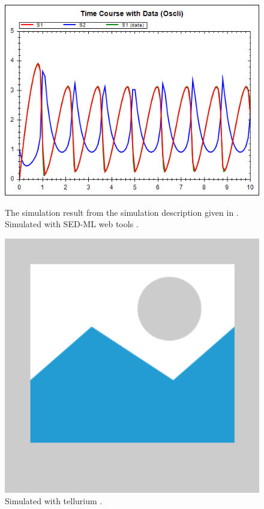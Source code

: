 \begin{figure}[ht]
    \centering
    \begin{minipage}{0.47\textwidth}
        \centering
        \includegraphics[width=1.0\textwidth]{examples/plotting-data/results/sedml_webtools/timecourse_with_data}
        \caption{The simulation result from the simulation description given in . Simulated with SED-ML web tools \citep{bergmann2017sed}.}
    \end{minipage}\hfill
    \begin{minipage}{0.47\textwidth}
        \centering
        \includegraphics[width=1.0\textwidth]{examples/placeholder}
        \caption{Simulated with tellurium \citep{tellurium}.}
    \end{minipage}
    \label{fig:plotting-data}
\end{figure}

